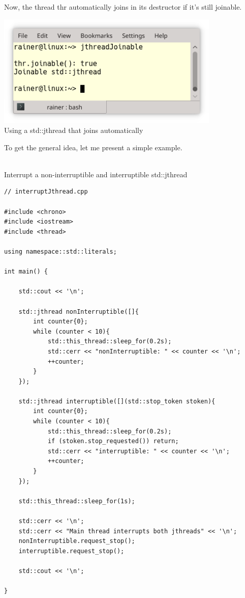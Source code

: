 Now, the thread thr automatically joins in its destructor if it’s still joinable.

\begin{center}
\includegraphics[width=0.8\textwidth]{content/3/chapter6/images/26.png}\\
Using a std::jthread that joins automatically
\end{center}


To get the general idea, let me present a simple example.

\hspace*{\fill} \\ %
\noindent
Interrupt a non-interruptible and interruptible std::jthread
\begin{lstlisting}[style=styleCXX]
// interruptJthread.cpp

#include <chrono>
#include <iostream>
#include <thread>

using namespace::std::literals;

int main() {

	std::cout << '\n';
	
	std::jthread nonInterruptible([]{
		int counter{0};
		while (counter < 10){
			std::this_thread::sleep_for(0.2s);
			std::cerr << "nonInterruptible: " << counter << '\n';
			++counter;
		}
	});
	
	std::jthread interruptible([](std::stop_token stoken){
		int counter{0};
		while (counter < 10){
			std::this_thread::sleep_for(0.2s);
			if (stoken.stop_requested()) return;
			std::cerr << "interruptible: " << counter << '\n';
			++counter;
		}
	});
	
	std::this_thread::sleep_for(1s);
	
	std::cerr << '\n';
	std::cerr << "Main thread interrupts both jthreads" << '\n';
	nonInterruptible.request_stop();
	interruptible.request_stop();
	
	std::cout << '\n';

}
\end{lstlisting}

